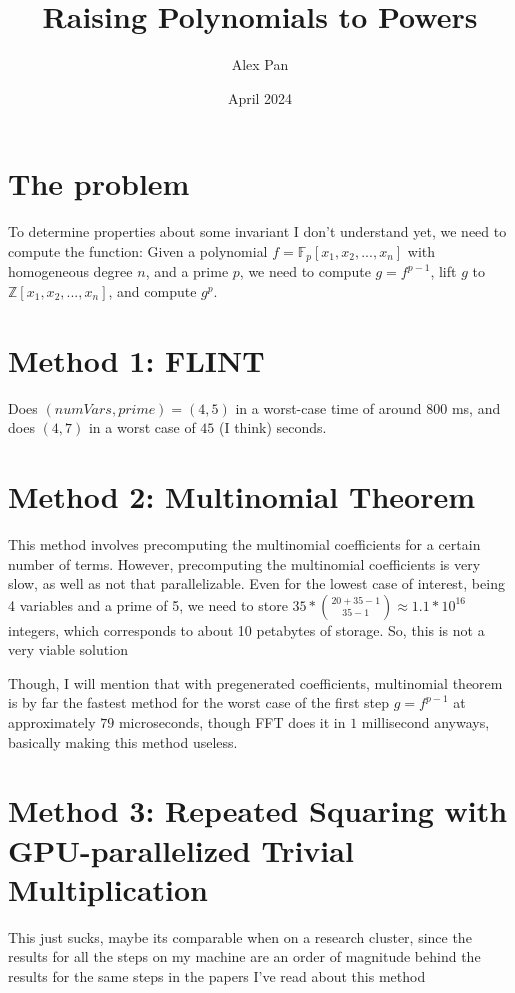 \documentclass{article}
\title{Raising Polynomials to Powers}
\author{Alex Pan}
\date{April 2024}
\begin{document}
\maketitle

\section*{The problem}
To determine properties about some invariant I don't understand yet, we need to compute the function: Given a polynomial $f = \mathbb{F}_{p}[x_1, x_2, ... , x_n]$ with homogeneous degree $n$, and a prime $p$, we need to compute $g = f^{p-1}$, lift $g$ to $\mathbb{Z}[x_1, x_2, ... , x_n]$, and compute $g^{p}$. 

\section*{Method 1: FLINT}
Does $(numVars, prime) = (4, 5)$ in a worst-case time of around $800$ ms, and does $(4, 7)$ in a worst case of $45$ (I think) seconds.

\section*{Method 2: Multinomial Theorem}
This method involves precomputing the multinomial coefficients for a certain number of terms. However, precomputing the multinomial coefficients is very slow, as well as not that parallelizable. Even for the lowest case of interest, being 4 variables and a prime of 5, we need to store $35 * \binom{20 + 35 - 1}{35 - 1} \approx 1.1 * 10^{16}$ integers, which corresponds to about 10 petabytes of storage. So, this is not a very viable solution

Though, I will mention that with pregenerated coefficients, multinomial theorem is by far the fastest method for the worst case of the first step $g = f^{p - 1}$ at approximately $79$ microseconds, though FFT does it in $1$ millisecond anyways, basically making this method useless.

\section*{Method 3: Repeated Squaring with GPU-parallelized Trivial Multiplication}
This just sucks, maybe its comparable when on a research cluster, since the results for all the steps on my machine are an order of magnitude behind the results for the same steps in the papers I've read about this method
\end{document}

